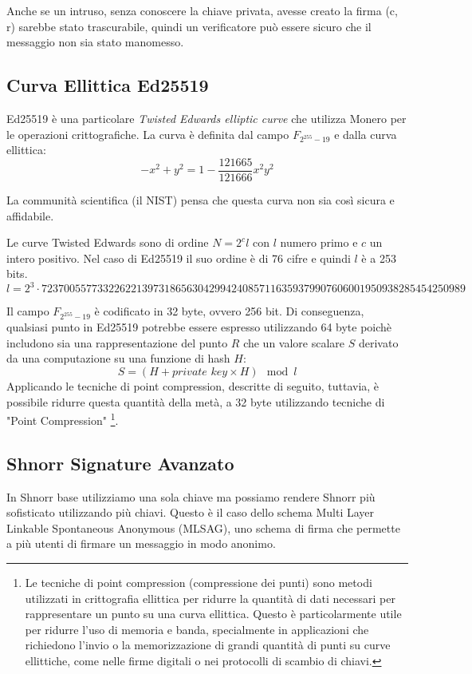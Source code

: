\documentclass[12pt,a4paper]{article}
\begin{document}
Anche se un intruso, senza conoscere la chiave privata, avesse creato la firma
(c, r) sarebbe stato trascurabile, quindi un verificatore può essere sicuro che
il messaggio non sia stato manomesso.

\subsection{Curva Ellittica Ed25519}
Ed25519 è una particolare \textit{Twisted Edwards elliptic curve} che utilizza
Monero per le operazioni crittografiche. La curva è definita dal campo $
F_{2^{255} - 19} $ e dalla curva ellittica:
$$ -x^2 + y^2 = 1 - \frac{121665}{121666}x^2y^2 $$

La communità scientifica (il NIST) pensa che questa curva non sia così sicura e
affidabile. 

Le curve Twisted Edwards sono di ordine $ N = 2^c l $ con $ l $ numero primo e $
c $ un intero positivo. Nel caso di Ed25519 il suo ordine è di 76 cifre e quindi
$ l $ è a 253 bits.
$$ l = 2^3 \cdot
7237005577332262213973186563042994240857116359379907606001950938285454250989 $$

Il campo $ F_{2^{255} - 19} $ è codificato in 32 byte, ovvero 256 bit. Di
conseguenza, qualsiasi punto in Ed25519 potrebbe essere espresso utilizzando 64
byte poichè includono sia una rappresentazione del punto $ R $ che un valore
scalare $ S $ derivato da una computazione su una funzione di hash $ H $:
$$ S = (H + \textit{private key} \times H) \mod l $$ Applicando le tecniche di
point compression, descritte di seguito, tuttavia, è possibile ridurre questa
quantità della metà, a 32 byte utilizzando tecniche di "Point Compression"
\footnote{ Le tecniche di point compression (compressione dei punti) sono metodi
utilizzati in crittografia ellittica per ridurre la quantità di dati necessari
per rappresentare un punto su una curva ellittica. Questo è particolarmente
utile per ridurre l'uso di memoria e banda, specialmente in applicazioni che
richiedono l'invio o la memorizzazione di grandi quantità di punti su curve
ellittiche, come nelle firme digitali o nei protocolli di scambio di chiavi.}.

\subsection{Shnorr Signature Avanzato}
In Shnorr base utilizziamo una sola chiave ma possiamo rendere Shnorr più
sofisticato utilizzando più chiavi. Questo è il caso dello schema Multi Layer
Linkable Spontaneous Anonymous (MLSAG), uno schema di firma che permette a più
utenti di firmare un messaggio in modo anonimo. 
\end{document}
